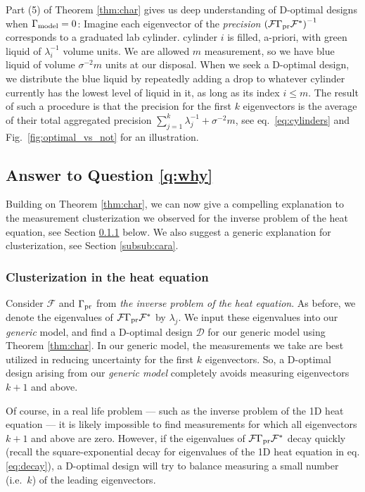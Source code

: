 \documentclass[ba]{imsart}
\newcommand{\fwd}{\mathcal{F}}
\newcommand{\opt}{\mathcal{D}}
\theoremstyle{plain}
\theoremstyle{definition}
\theoremstyle{remark}
\begin{document}
Part (5) of Theorem \ref{thm:char} gives us deep understanding of
D-optimal designs when $\Gamma_{\textup{model}} = 0$: Imagine each eigenvector of the
\emph{precision} $\left(\fwd \prcov \fwd^*\right )^{-1}$ corresponds
to a graduated lab cylinder. cylinder $i$ is filled, a-priori, with green liquid of
$\lambda_i^{-1}$ volume units. We are allowed $m$ measurement, so we
have blue liquid of volume $\sigma^{-2}m$ units at our disposal. When
we seek a D-optimal design, we distribute the blue liquid by
repeatedly adding a drop to whatever cylinder currently has the lowest
level of liquid in it, as long as its index $i \leq m$. The result of
such a procedure is that the precision for the first $k$ eigenvectors
is the average of their total aggregated precision $\sum_{j=1}^k
\lambda_j^{-1} + \sigma^{-2}m$, see eq.~\eqref{eq:cylinders} and
Fig.~\ref{fig:optimal_vs_not} for an illustration.


\subsection{Answer to Question \ref{q:why}}\label{subsec:why}
Building on Theorem \ref{thm:char}, we can now give a compelling
explanation to the measurement clusterization we observed for the
inverse problem of the heat equation, see Section
\ref{subsub:clusterization1} below. We also suggest a generic
explanation for clusterization, see Section \ref{subsub:cara}.

\subsubsection{Clusterization in the heat equation}\label{subsub:clusterization1}
Consider $\fwd$ and $\Gamma_{\textup{pr}}$ from \emph{the inverse problem of the
heat equation}. As before, we denote the eigenvalues of
$\fwd\prcov\fwd^*$ by $\lambda_j$. We input these eigenvalues into our
\emph{generic} model, and find a D-optimal design $\opt$ for our
generic model using Theorem \ref{thm:char}. In our generic model, the
measurements we take are best utilized in reducing uncertainty for the
first $k$ eigenvectors. So, a D-optimal design arising from our
\emph{generic model} completely avoids measuring eigenvectors $k+1$
and above.

Of course, in a real life problem --- such as the inverse problem of
the 1D heat equation --- it is likely impossible to find measurements
for which all eigenvectors $k+1$ and above are zero. However, if the
eigenvalues of $\fwd\prcov\fwd^*$ decay quickly (recall the
square-exponential decay for eigenvalues of the 1D heat equation in
eq.\eqref{eq:decay}), a D-optimal design will try to balance measuring
a small number (i.e.~$k$) of the leading eigenvectors.
\end{document}
